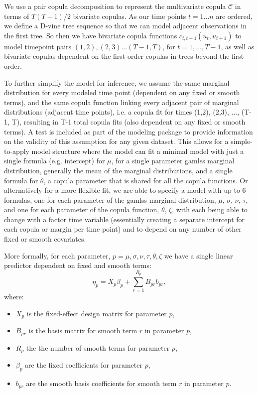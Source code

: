 \documentclass{article}
\begin{document}
We use a pair copula decomposition to represent the multivariate copula $\mathcal{C}$ in terms of $T(T-1)/2$ bivariate copulas. As our time points $t=1...n$ are ordered, we define a D-vine tree sequence\citep{smith_copula_2015} so that we can model adjacent observations in the first tree. So then we have bivariate copula functions $c_{t,t+1}(u_t,u_{t+1})$ to model timepoint pairs $(1,2), (2,3)...(T-1,T)$, for $t=1,...,T-1$, as well as bivariate copulas dependent on the first order copulas in trees beyond the first order.

To further simplify the model for inference, we assume the same marginal distribution for every modeled time point (dependent on any fixed or smooth terms), and the same copula function linking every adjacent pair of marginal distributions (adjacent time points), i.e. a copula fit for times (1,2), (2,3), ..., (T-1, T), resulting in T-1 total copula fits (also dependent on any fixed or smooth terms). A test is included as part of the modeling package to provide information on the validity of this assumption for any given dataset. This allows for a simple-to-apply model structure where the model can fit a minimal model with just a single formula (e.g. intercept) for $\mu$, for a single parameter gamlss marginal distribution, generally the mean of the marginal distributions, and a single formula for $\theta$, a copula parameter that is shared for all the copula functions. Or alternatively for a more flexible fit, we are able to specify a model with up to 6 formulas, one for each parameter of the gamlss marginal distribution, $\mu$, $\sigma$, $\nu$, $\tau$, and one for each parameter of the copula function, $\theta$, $\zeta$, with each being able to change with a factor time variable (essentially creating a separate intercept for each copula or margin per time point) and to depend on any number of other fixed or smooth covariates. 

More formally, for each parameter, $p=\mu,\sigma, \nu, \tau, \theta,\zeta$ we have a single linear predictor dependent on fixed and smooth terms:
\begin{equation}
\eta_p = X_p \beta_p + \sum_{r=1}^{R_p} B_{pr} b_{pr},
\end{equation}
where:
\begin{itemize}
\item $X_p$ is the fixed-effect design matrix for parameter $p$,
\item $B_{pr}$ is the basis matrix for smooth term $r$ in parameter $p$,
\item $R_p$ the the number of smooth terms for parameter $p$,
\item $\beta_p$ are the fixed coefficients for parameter $p$,
\item $b_{pr}$ are the smooth basis coefficients for smooth term $r$ in parameter $p$.
\end{itemize}
\end{document}
